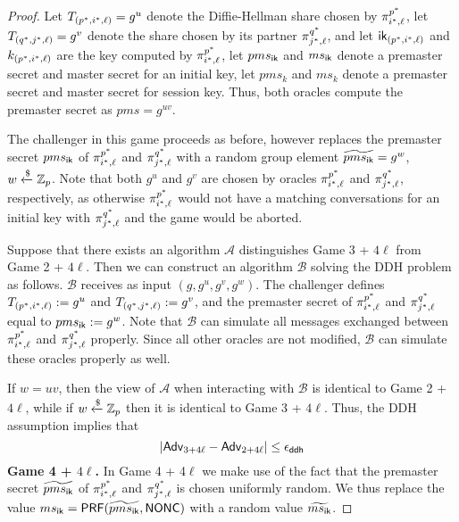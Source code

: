 \begin{proof}
 Let $T_{(p^{\ast}, i^{\ast}, \ell)} = g^u$ denote the Diffie-Hellman share chosen by $\pi^{p^{\ast}}_{i^{\ast},\ell}$, let $T_{(q^{\ast}, j^{\ast}, \ell)} = g^v$ denote the share chosen by its partner $\pi^{q^{\ast}}_{j^{\ast},\ell}$, and let $\mathsf{ik}_{(p^{\ast}, i^{\ast}, \ell)}$ and $k_{(p^{\ast}, i^{\ast}, \ell)}$ are the key computed by $\pi^{p^{\ast}}_{i^{\ast},\ell}$, let $pms_{\mathsf{ik}}$ and $ms_{\mathsf{ik}}$ denote a premaster secret and master secret for an initial key, let $pms_{k}$ and $ms_{k}$ denote a premaster secret and master secret for session key. Thus, both oracles compute the premaster secret as $pms = g^{uv}$.

 The challenger in this game proceeds as before, however replaces the premaster secret $pms_{\mathsf{ik}}$ of $\pi^{p^{\ast}}_{i^{\ast},\ell}$ and $\pi^{q^{\ast}}_{j^{\ast},\ell}$ with a random group element $\widetilde{pms_{\mathsf{ik}}} = g^w$, $w \xleftarrow{\$} \mathbb{Z}_p$. Note that both $g^u$ and $g^v$ are chosen by oracles $\pi^{p^{\ast}}_{i^{\ast},\ell}$ and $\pi^{q^{\ast}}_{j^{\ast},\ell}$, respectively, as otherwise $\pi^{p^{\ast}}_{i^{\ast},\ell}$ would not have a matching conversations for an initial key with $\pi^{q^{\ast}}_{j^{\ast},\ell}$ and the game would be aborted.

 Suppose that there exists an algorithm $\mathcal{A}$ distinguishes Game 3 + $4\ell$ from Game 2 + $4\ell$. Then we can construct an algorithm $\mathcal{B}$ solving the DDH problem as follows. $\mathcal{B}$ receives as input $(g,g^u,g^v,g^w)$. The challenger defines $T_{(p^{\ast}, i^{\ast}, \ell)} := g^u$ and $T_{(q^{\ast}, j^{\ast}, \ell)} := g^v$, and the premaster secret of $\pi^{p^{\ast}}_{i^{\ast},\ell}$ and $\pi^{q^{\ast}}_{j^{\ast},\ell}$ equal to $pms_{\mathsf{ik}} := g^w$. Note that $\mathcal{B}$ can simulate all messages exchanged between $\pi^{p^{\ast}}_{i^{\ast},\ell}$ and $\pi^{q^{\ast}}_{j^{\ast},\ell}$ properly. Since all other oracles are not modified, $\mathcal{B}$ can simulate these oracles properly as well.

 If $w=uv$, then the view of $\mathcal{A}$ when interacting with $\mathcal{B}$ is identical to Game 2 + $4\ell$, while if $w \xleftarrow{\$}\mathbb{Z}_p$ then it is identical to Game 3 + $4\ell$. Thus, the DDH assumption implies that
 \begin{equation}
  |\mathsf{Adv}_{3 + 4\ell} - \mathsf{Adv}_{2 + 4\ell}| \leq \epsilon_{\mathsf{ddh}}
 \end{equation}%
%
%
 \textbf{Game 4 + $4\ell$.} In Game 4 + 4$\ell$ we make use of the fact that the premaster secret $\widetilde{pms_{\mathsf{ik}}}$ of $\pi^{p^{\ast}}_{i^{\ast},\ell}$ and $\pi^{q^{\ast}}_{j^{\ast},\ell}$ is chosen uniformly random. We thus replace the value $ms_{\mathsf{ik}} = \mathsf{PRF}(\widetilde{pms_{\mathsf{ik}}}, \mathsf{NONC})$ with a random value $\widetilde{ms_{\mathsf{ik}}}$.


\end{proof}
